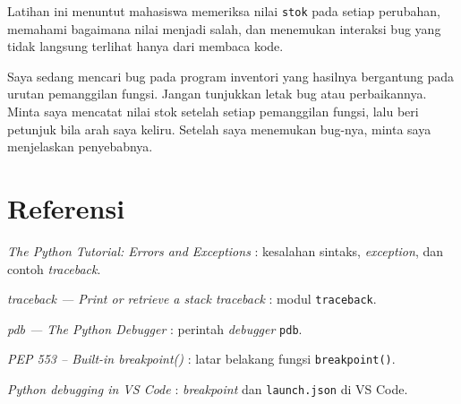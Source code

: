 Latihan ini menuntut mahasiswa memeriksa nilai \texttt{stok} pada setiap perubahan, memahami bagaimana nilai menjadi salah, dan menemukan interaksi bug yang tidak langsung terlihat hanya dari membaca kode.

\begin{promptterarah}
Saya sedang mencari bug pada program inventori yang hasilnya bergantung pada urutan pemanggilan fungsi. Jangan tunjukkan letak bug atau perbaikannya. Minta saya mencatat nilai stok setelah setiap pemanggilan fungsi, lalu beri petunjuk bila arah saya keliru. Setelah saya menemukan bug-nya, minta saya menjelaskan penyebabnya.
\end{promptterarah}

\section*{Referensi}
\begin{daftarrapat}
  \item \textit{The Python Tutorial: Errors and Exceptions} \cite{py-tut-errors}: kesalahan sintaks, \textit{exception}, dan contoh \textit{traceback}.
  \item \textit{traceback — Print or retrieve a stack traceback} \cite{py-traceback}: modul \texttt{traceback}.
  \item \textit{pdb — The Python Debugger} \cite{py-pdb}: perintah \textit{debugger} \texttt{pdb}.
  \item \textit{PEP 553 – Built-in breakpoint()} \cite{pep553}: latar belakang fungsi \texttt{breakpoint()}.
  \item \textit{Python debugging in VS Code} \cite{vscode-debug}: \textit{breakpoint} dan \texttt{launch.json} di VS Code.
\end{daftarrapat}
